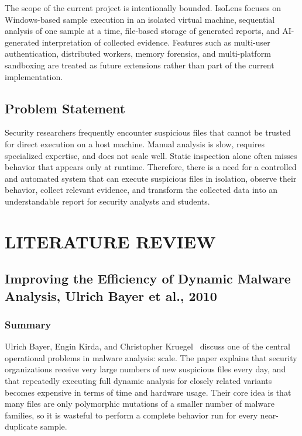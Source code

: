 \documentclass[a4paper,12pt,oneside]{report}
\begin{document}
\par

\par

The scope of the current project is intentionally bounded. IsoLens focuses on Windows-based sample execution in an isolated virtual machine, sequential analysis of one sample at a time, file-based storage of generated reports, and AI-generated interpretation of collected evidence. Features such as multi-user authentication, distributed workers, memory forensics, and multi-platform sandboxing are treated as future extensions rather than part of the current implementation.

\section{Problem Statement}
Security researchers frequently encounter suspicious files that cannot be trusted for direct execution on a host machine. Manual analysis is slow, requires specialized expertise, and does not scale well. Static inspection alone often misses behavior that appears only at runtime. Therefore, there is a need for a controlled and automated system that can execute suspicious files in isolation, observe their behavior, collect relevant evidence, and transform the collected data into an understandable report for security analysts and students.

\chapter{LITERATURE REVIEW}
\section{Improving the Efficiency of Dynamic Malware Analysis, Ulrich Bayer et al., 2010}

\subsection{Summary}
Ulrich Bayer, Engin Kirda, and Christopher Kruegel~\cite{bayer2010} discuss one of the central operational problems in malware analysis: scale. The paper explains that security organizations receive very large numbers of new suspicious files every day, and that repeatedly executing full dynamic analysis for closely related variants becomes expensive in terms of time and hardware usage. Their core idea is that many files are only polymorphic mutations of a smaller number of malware families, so it is wasteful to perform a complete behavior run for every near-duplicate sample.
\end{document}
